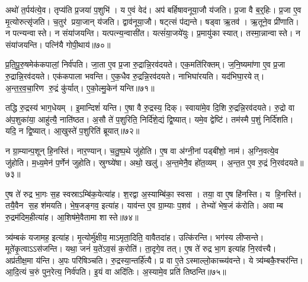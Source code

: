 अथो॑ त॒र्पय॑त्ये॒व।
तृप्य॑ति प्र॒जया॑ प॒शुभि॑।
य ए॒वं वेद॑।
अप॑ बर्\mbox{}हिषावनूया॒जौ य॑जति।
प्र॒जा वै ब॒र्॒हिः।
प्र॒जा ए॒व मृ॒त्योरुत्सृ॑जति।
च॒तुर॑ प्रया॒जान् य॑जति।
द्वाव॑नूया॒जौ।
षट्त्सं प॑द्यन्ते।
षड्वा ऋ॒तव॑।
ऋ॒तूने॒व प्री॑णाति।
न पत्न्यन्वास्ते।
न संया॑जयन्ति।
यत्पत्न्य॒न्वासी॑त।
यत्सं॑या॒जये॑युः।
प्र॒मायु॑का स्यात्।
तस्मा॒न्नान्वास्ते।
न संया॑जयन्ति।
पत्नि॑यै गोपी॒थाय॑॥७०॥

प्र॒ति॒पू॒रु॒षमेक॑कपालां॒ निर्व॑पति।
जा॒ता ए॒व प्र॒जा रु॒द्रान्नि॒रव॑दयते।
एक॒मति॑रिक्तम्।
ज॒नि॒ष्यमा॑णा ए॒व प्र॒जा रु॒द्रान्नि॒रव॑दयते।
एक॑कपाला भवन्ति।
ए॒क॒धैव रु॒द्रन्नि॒रव॑दयते।
नाभिघा॑रयति।
यद॑भिघा॒रयेत्।
अ॒न्त॒र॒व॒चा॒रिण रु॒द्रं कु॑र्यात्।
ए॒को॒ल्मु॒केन॑ यन्ति॥७१॥

तद्धि रु॒द्रस्य॑ भाग॒धेयम्।
इ॒मान्दिशं॑ यन्ति।
ए॒षा वै रु॒द्रस्य॒ दिक्।
स्वाया॑मे॒व दि॒शि रु॒द्रन्नि॒रव॑दयते।
रु॒द्रो वा अ॑प॒शुका॑या॒ आहु॑त्यै॒ नाति॑ष्ठत।
अ॒सौ ते॑ प॒शुरिति॒ निर्दि॑शे॒द्यं द्वि॒ष्यात्।
यमे॒व द्वेष्टि॑।
तम॑स्मै प॒शुं निर्दि॑शति।
यदि॒ न द्वि॒ष्यात्।
आ॒खुस्ते॑ प॒शुरिति॑ ब्रूयात्॥७२॥

न ग्रा॒म्यान्प॒शून् हि॒नस्ति॑।
नार॒ण्यान्।
च॒तु॒ष्प॒थे जु॑होति।
ए॒ष वा अ॑ग्नी॒नां पड्बी॑शो॒ नाम॑।
अ॒ग्नि॒वत्ये॒व जु॑होति।
म॒ध्य॒मेन॑ प॒र्णेन॑ जुहोति।
स्रुग्घ्ये॑षा।
अथो॒ खलु॑।
अ॒न्त॒मेनै॒व हो॑त॒व्यम्।
अ॒न्त॒त ए॒व रु॒द्रं नि॒रव॑दयते॥७३॥

ए॒ष ते॑ रुद्र भा॒गः स॒ह स्वस्राऽम्बि॑क॒येत्या॑ह।
श॒रद्वा अ॒स्याम्बि॑का॒ स्वसा।
तया॒ वा ए॒ष हि॑नस्ति।
य हि॒नस्ति॑।
तयै॒वैन स॒ह श॑मयति।
भे॒ष॒जङ्गव॒ इत्या॑ह।
याव॑न्त ए॒व ग्रा॒म्याः प॒शव॑।
तेभ्यो॑ भेष॒जं क॑रोति।
अवाम्ब रु॒द्रम॑दिम॒हीत्या॑ह।
आ॒शिष॑मे॒वैतामा शास्ते॥७४॥

त्र्य॑म्बकं यजामह॒ इत्या॑ह।
मृ॒त्योर्मु॑क्षीय॒ माऽमृता॒दिति॒ वावैतदा॑ह।
उत्कि॑रन्ति।
भग॑स्य लीप्सन्ते।
मूते॑कृ॒त्वाऽऽस॑जन्ति।
यथा॒ जनं॑ य॒ते॑ऽव॒सं क॒रोति॑।
ता॒दृगे॒व तत्।
ए॒ष ते॑ रुद्र भा॒ग इत्या॑ह नि॒रव॑त्त्यै।
अप्र॑तीक्ष॒मा य॑न्ति।
अ॒पः परि॑षिञ्चति।
रु॒द्रस्या॒न्तर्\mbox{}हि॑त्यै।
प्र वा ए॒तेऽस्माल्लो॒काच्च्य॑वन्ते।
ये त्र्य॑म्बकै॒श्चर॑न्ति।
आ॒दि॒त्यं च॒रुं पुन॒रेत्य॒ निर्व॑पति।
इ॒यं वा अदि॑तिः।
अ॒स्यामे॒व प्रति॑ तिष्ठन्ति॥७५॥\anuvakamend[य॒न्ति॒ ब्रू॒या॒न्नि॒रव॑दयते शास्ते सिञ्चति॒ षट्च॑]




\clearpage
{}
\setcounter{anuvakam}{0}

